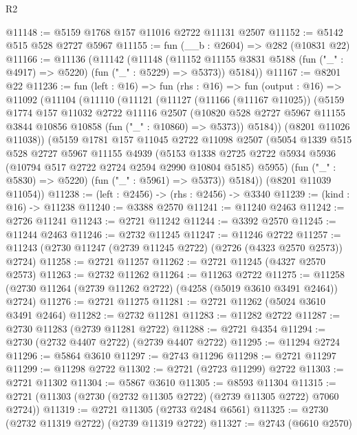 \begin{lexlean}{R2}
\begin{coremodule}
@11148 := @5159 @1768 @157 @11016 @2722 @11131 @2507
@11152 := @5142 @515 @528 @2727 @5967
@11155 := fun (__b : @2604) => @282 (@10831 @22)
@11166 := @11136
    (@11142
      (@11148
        (@11152 @11155 @3831 @5188 (fun ("_" : @4917) => @5220) (fun ("_" : @5229) => @5373))
        @5184))
@11167 := @8201 @22
@11236 := fun (left : @16) =>
  fun (rhs : @16) =>
  fun (output : @16) =>
  @11092
    (@11104
      (@11110
        (@11121
          (@11127
            (@11166 (@11167 @11025))
            (@5159
              @1774
              @157
              @11032
              @2722
              @11116
              @2507
              (@10820 @528 @2727 @5967 @11155 @3844 @10856 @10858 (fun ("_" : @10860) => @5373))
              @5184))
          (@8201 @11026 @11038))
        (@5159
          @1781
          @157
          @11045
          @2722
          @11098
          @2507
          (@5054
            @1339
            @515
            @528
            @2727
            @5967
            @11155
            @4939
            (@5153
              @1338
              @2725
              @2722
              @5934
              @5936
              (@10794 @517 @2722 @2724 @2594 @2990 @10804 @5185)
              @5955)
            (fun ("_" : @5830) => @5220)
            (fun ("_" : @5961) => @5373))
          @5184))
      (@8201 @11039 @11054))
@11238 := (left : @2456) -> (rhs : @2456) -> @3340
@11239 := (kind : @16) -> @11238
@11240 := @3388 @2570
@11241 := @11240 @2463
@11242 := @2726 @11241
@11243 := @2721 @11242
@11244 := @3392 @2570
@11245 := @11244 @2463
@11246 := @2732 @11245
@11247 := @11246 @2722
@11257 := @11243 (@2730 @11247 (@2739 @11245 @2722) (@2726 (@4323 @2570 @2573)) @2724)
@11258 := @2721 @11257
@11262 := @2721 @11245 (@4327 @2570 @2573)
@11263 := @2732 @11262
@11264 := @11263 @2722
@11275 := @11258 (@2730 @11264 (@2739 @11262 @2722) (@4258 (@5019 @3610 @3491 @2464)) @2724)
@11276 := @2721 @11275
@11281 := @2721 @11262 (@5024 @3610 @3491 @2464)
@11282 := @2732 @11281
@11283 := @11282 @2722
@11287 := @2730 @11283 (@2739 @11281 @2722)
@11288 := @2721 @4354
@11294 := @2730 (@2732 @4407 @2722) (@2739 @4407 @2722)
@11295 := @11294 @2724
@11296 := @5864 @3610
@11297 := @2743 @11296
@11298 := @2721 @11297
@11299 := @11298 @2722
@11302 := @2721 (@2723 @11299) @2722
@11303 := @2721 @11302
@11304 := @5867 @3610
@11305 := @8593 @11304
@11315 := @2721 (@11303 (@2730 (@2732 @11305 @2722) (@2739 @11305 @2722) @7060 @2724))
@11319 := @2721 @11305 (@2733 @2484 @6561)
@11325 := @2730 (@2732 @11319 @2722) (@2739 @11319 @2722)
@11327 := @2743 (@6610 @2570)

\end{coremodule}
\end{lexlean}
